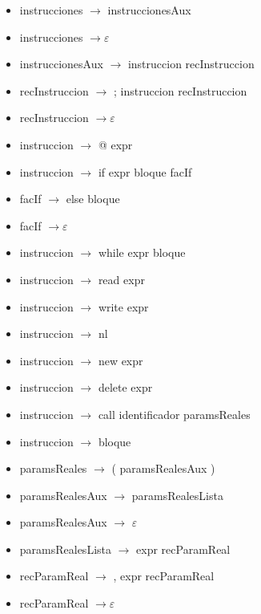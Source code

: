 \documentclass[11pt]{article}
\begin{document}
        \begin{itemize}
            \item instrucciones $\rightarrow$ instruccionesAux
            \item instrucciones $\rightarrow \varepsilon$
            \item instruccionesAux $\rightarrow$ instruccion recInstruccion
            \item recInstruccion $\rightarrow$ ; instruccion recInstruccion
            \item recInstruccion $\rightarrow \varepsilon$
            \item instruccion $\rightarrow$ @ expr
            \item instruccion $\rightarrow$ if expr bloque facIf
            \item facIf $\rightarrow$ else bloque
            \item facIf $\rightarrow \varepsilon$
            \item instruccion $\rightarrow$ while expr bloque
            \item instruccion $\rightarrow$ read expr
            \item instruccion $\rightarrow$ write expr 
            \item instruccion $\rightarrow$ nl
            \item instruccion $\rightarrow$ new expr
            \item instruccion $\rightarrow$ delete expr
            \item instruccion $\rightarrow$ call identificador paramsReales
            \item instruccion $\rightarrow$ bloque
            \item paramsReales $\rightarrow$ ( paramsRealesAux )
            \item paramsRealesAux $\rightarrow$ paramsRealesLista
            \item paramsRealesAux $\rightarrow$ $\varepsilon$
            \item paramsRealesLista $\rightarrow$ expr recParamReal
            \item recParamReal $\rightarrow$ , expr recParamReal
            \item recParamReal $\rightarrow \varepsilon$
        \end{itemize}
        \
\end{document}

